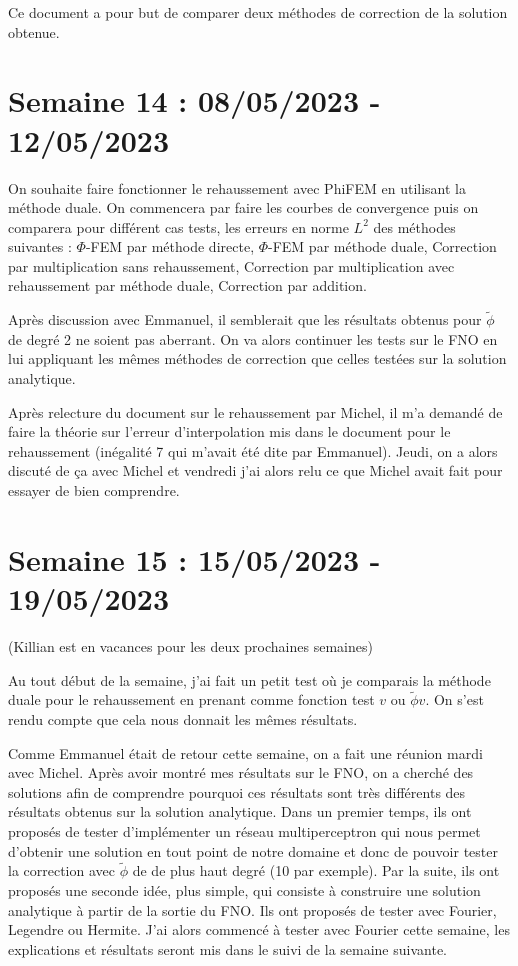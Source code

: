 \documentclass[french]{article}
\begin{document}
	Ce document a pour but de comparer deux méthodes de correction de la solution obtenue.
\section{Semaine 14 : 08/05/2023 - 12/05/2023}
	On souhaite faire fonctionner le rehaussement avec PhiFEM en utilisant la méthode duale. On commencera par faire les courbes de convergence puis on comparera pour différent cas tests, les erreurs en norme $L^2$ des méthodes suivantes : $\Phi$-FEM par méthode directe, $\Phi$-FEM par méthode duale, Correction par multiplication sans rehaussement, Correction par multiplication avec rehaussement par méthode duale, Correction par addition.
	
	Après discussion avec Emmanuel, il semblerait que les résultats obtenus pour $\tilde{\phi}$ de degré 2 ne soient pas aberrant. On va alors continuer les tests sur le FNO en lui appliquant les mêmes méthodes de correction que celles testées sur la solution analytique.
	
	Après relecture du document sur le rehaussement par Michel, il m'a demandé de faire la théorie sur l'erreur d'interpolation mis dans le document pour le rehaussement (inégalité 7 qui m'avait été dite par Emmanuel). Jeudi, on a alors discuté de ça avec Michel et vendredi j'ai alors relu ce que Michel avait fait pour essayer de bien comprendre.
\section{Semaine 15 : 15/05/2023 - 19/05/2023}
	(Killian est en vacances pour les deux prochaines semaines)
	
	Au tout début de la semaine, j'ai fait un petit test où je comparais la méthode duale pour le rehaussement en prenant comme fonction test $v$ ou $\tilde{\phi}v$. On s'est rendu compte que cela nous donnait les mêmes résultats.
	
	Comme Emmanuel était de retour cette semaine, on a fait une réunion mardi avec Michel. Après avoir montré mes résultats sur le FNO, on a cherché des solutions afin de comprendre pourquoi ces résultats sont très différents des résultats obtenus sur la solution analytique. Dans un premier temps, ils ont proposés de tester d'implémenter un réseau multiperceptron qui nous permet d'obtenir une solution en tout point de notre domaine et donc de pouvoir tester la correction avec $\tilde{\phi}$ de de plus haut degré (10 par exemple). Par la suite, ils ont proposés une seconde idée, plus simple, qui consiste à construire une solution analytique à partir de la sortie du FNO. Ils ont proposés de tester avec Fourier, Legendre ou Hermite. J'ai alors commencé à tester avec Fourier cette semaine, les explications et résultats seront mis dans le suivi de la semaine suivante. 
	
\end{document}
